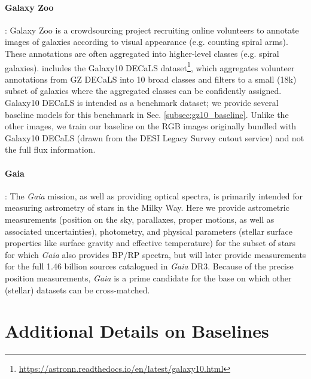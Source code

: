 \paragraph{Galaxy Zoo}: Galaxy Zoo is a crowdsourcing project recruiting online volunteers to annotate images of galaxies according to visual appearance (e.g. counting spiral arms). These annotations are often aggregated into higher-level classes (e.g. spiral galaxies). \pile includes the Galaxy10 DECaLS dataset\footnote{\href{https://astronn.readthedocs.io/en/latest/galaxy10.html}{https://astronn.readthedocs.io/en/latest/galaxy10.html}}, which aggregates volunteer annotations from GZ DECaLS \cite{Walmsley2023GZDESI} into 10 broad classes and filters to a small (18k) subset of galaxies where the aggregated classes can be confidently assigned. Galaxy10 DECaLS is intended as a benchmark dataset; we provide several baseline models for this benchmark in Sec. \ref{subsec:gz10_baseline}. Unlike the other \pile images, we train our baseline on the RGB images originally bundled with Galaxy10 DECaLS (drawn from the DESI Legacy Survey cutout service) and not the full flux information.



\paragraph{Gaia} \label{par:gaia_astrometry}: The \textit{Gaia} mission, as well as providing optical spectra, is primarily intended for measuring astrometry of stars in the Milky Way. Here we provide astrometric measurements (position on the sky, parallaxes, proper motions, as well as associated uncertainties), photometry, and physical parameters (stellar surface properties like surface gravity and effective temperature) for the subset of stars for which \textit{Gaia} also provides BP/RP spectra, but will later provide measurements for the full 1.46 billion sources catalogued in \textit{Gaia} DR3. Because of the precise position measurements, \textit{Gaia} is a prime candidate for the base on which other (stellar) datasets can be cross-matched.

\section{Additional Details on Baselines}

